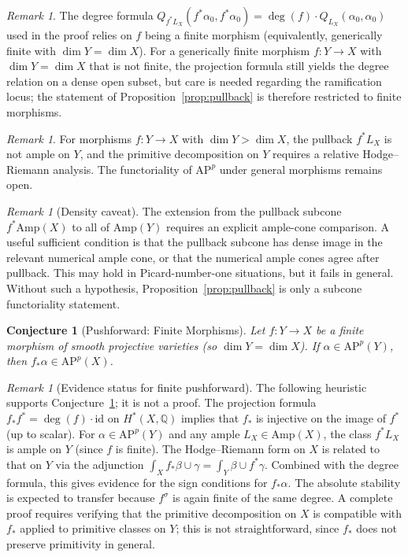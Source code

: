 \documentclass[aps,prd,twocolumn,superscriptaddress,nofootinbib]{revtex4-2}
\newtheorem{conjecture}[theorem]{Conjecture}
\theoremstyle{definition}
\theoremstyle{remark}
\newtheorem{remark}[theorem]{Remark}
\begin{document}
\begin{remark}
The degree formula $Q_{f^*L_X}(f^*\alpha_0, f^*\alpha_0) = \deg(f) \cdot Q_{L_X}(\alpha_0, \alpha_0)$ used in the proof relies on $f$ being a finite morphism (equivalently, generically finite with $\dim Y = \dim X$). For a generically finite morphism $f: Y \to X$ with $\dim Y = \dim X$ that is not finite, the projection formula still yields the degree relation on a dense open subset, but care is needed regarding the ramification locus; the statement of Proposition~\ref{prop:pullback} is therefore restricted to finite morphisms.
\end{remark}

\begin{remark}
For morphisms $f: Y \to X$ with $\dim Y > \dim X$, the pullback $f^*L_X$ is not ample on $Y$, and the primitive decomposition on $Y$ requires a relative Hodge--Riemann analysis. The functoriality of $\mathrm{AP}^p$ under general morphisms remains open.
\end{remark}

\begin{remark}[Density caveat]\label{rem:density-caveat}
The extension from the pullback subcone $f^*\mathrm{Amp}(X)$ to all of $\mathrm{Amp}(Y)$ requires an explicit ample-cone comparison. A useful sufficient condition is that the pullback subcone has dense image in the relevant numerical ample cone, or that the numerical ample cones agree after pullback. This may hold in Picard-number-one situations, but it fails in general. Without such a hypothesis, Proposition~\ref{prop:pullback} is only a subcone functoriality statement.
\end{remark}

\begin{conjecture}[Pushforward: Finite Morphisms]
\label{prop:pushforward}
Let $f: Y \to X$ be a finite morphism of smooth projective varieties (so $\dim Y = \dim X$). If $\alpha \in \mathrm{AP}^{p}(Y)$, then $f_*\alpha \in \mathrm{AP}^p(X)$.
\end{conjecture}

\begin{remark}[Evidence status for finite pushforward]
The following heuristic supports Conjecture~\ref{prop:pushforward}; it is not
a proof. The projection formula $f_*f^* = \deg(f) \cdot \mathrm{id}$ on
$H^*(X, \mathbb{Q})$ implies that $f_*$ is injective on the image of $f^*$
(up to scalar). For $\alpha \in \mathrm{AP}^p(Y)$ and any ample
$L_X \in \mathrm{Amp}(X)$, the class $f^*L_X$ is ample on $Y$ (since $f$ is
finite). The Hodge--Riemann form on $X$ is related to that on $Y$ via the
adjunction $\int_X f_*\beta \cup \gamma = \int_Y \beta \cup f^*\gamma$.
Combined with the degree formula, this gives evidence for the sign conditions
for $f_*\alpha$. The absolute stability is expected to transfer because
$f^\sigma$ is again finite of the same degree. A complete proof requires
verifying that the primitive decomposition on $X$ is compatible with $f_*$
applied to primitive classes on $Y$; this is not straightforward, since $f_*$
does not preserve primitivity in general.
\end{remark}
\end{document}
